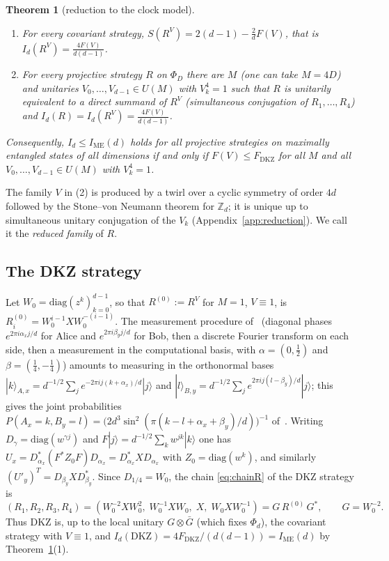 \documentclass[11pt]{amsart}
\newtheorem{theorem}{Theorem}[section]
\theoremstyle{definition}
\theoremstyle{remark}
\newcommand{\Z}{\mathbb{Z}}
\newcommand{\FD}{F_{\mathrm{DKZ}}}
\newcommand{\IME}{I_{\mathrm{ME}}}
\begin{document}
\begin{theorem}[reduction to the clock model]\label{thm:reduction}
\begin{enumerate}
\item For every covariant strategy, $S(R^V)=2(d-1)-\frac2d F(V)$, that is $I_d(R^V)=\frac{4F(V)}{d(d-1)}$.
\item For every projective strategy $R$ on $\Phi_D$ there are $M$ (one can take $M=4D$) and unitaries
$V_0,\dots,V_{d-1}\in U(M)$ with $V_k^4=1$ such that $R$ is unitarily equivalent to a direct summand of
$R^V$ (simultaneous conjugation of $R_1,\dots,R_4$) and $I_d(R)=I_d(R^V)=\frac{4F(V)}{d(d-1)}$.
\end{enumerate}
Consequently, $I_d\le\IME(d)$ holds for all projective strategies on maximally entangled states of all
dimensions if and only if $F(V)\le\FD$ for all $M$ and all $V_0,\dots,V_{d-1}\in U(M)$ with $V_k^4=1$.
\end{theorem}

The family $V$ in (2) is produced by a twirl over a cyclic symmetry of order $4d$ followed by the
Stone--von Neumann theorem for $\Z_d$; it is unique up to simultaneous unitary conjugation of the $V_k$
(Appendix~\ref{app:reduction}). We call it the \emph{reduced family} of $R$.

\subsection{The DKZ strategy}\label{subsec:dkz}
Let $W_0=\mathrm{diag}(z^k)_{k=0}^{d-1}$, so that $R^{(0)}:=R^V$ for $M=1$, $V\equiv1$, is
$R^{(0)}_i=W_0^{i-1}XW_0^{-(i-1)}$. The measurement procedure of~\cite[eqs.~(12)--(15)]{CGLMP} (diagonal phases
$e^{2\pi i\alpha_xj/d}$ for Alice and $e^{2\pi i\beta_yj/d}$ for Bob, then a discrete Fourier transform on each
side, then a measurement in the computational basis, with $\alpha=(0,\frac12)$ and $\beta=(\frac14,-\frac14)$)
amounts to measuring in the orthonormal bases
$|k\rangle_{A,x}=d^{-1/2}\sum_je^{-2\pi ij(k+\alpha_x)/d}|j\rangle$ and
$|l\rangle_{B,y}=d^{-1/2}\sum_je^{2\pi ij(l-\beta_y)/d}|j\rangle$; this gives the joint probabilities
$P(A_x=k,B_y=l)=\bigl(2d^3\sin^2(\pi(k-l+\alpha_x+\beta_y)/d)\bigr)^{-1}$ of~\cite[eq.~(15)]{CGLMP}. Writing
$D_\gamma=\mathrm{diag}(w^{\gamma j})$ and $F|j\rangle=d^{-1/2}\sum_kw^{jk}|k\rangle$ one has
$U_x=D_{\alpha_x}^*(F^*Z_0F)D_{\alpha_x}=D_{\alpha_x}^*XD_{\alpha_x}$ with $Z_0=\mathrm{diag}(w^k)$, and similarly
$(U'_y)^T=D_{\beta_y}XD_{\beta_y}^*$. Since $D_{1/4}=W_0$, the chain \eqref{eq:chainR} of the DKZ strategy is
\[
(R_1,R_2,R_3,R_4)=(W_0^{-2}XW_0^{2},\;W_0^{-1}XW_0,\;X,\;W_0XW_0^{-1})=G\,R^{(0)}\,G^*,\qquad G=W_0^{-2}.
\]
Thus DKZ is, up to the local unitary $G\otimes\bar G$ (which fixes $\Phi_d$), the covariant strategy with
$V\equiv1$, and $I_d(\mathrm{DKZ})=4\FD/(d(d-1))=\IME(d)$ by Theorem~\ref{thm:reduction}(1).
\end{document}
